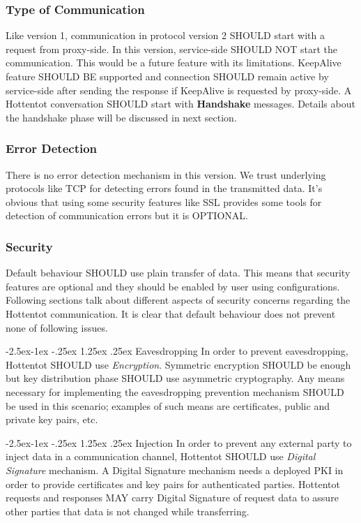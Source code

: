 \documentclass[10pt,a4paper]{article}
\makeatletter
\renewcommand\paragraph{\@startsection{paragraph}{4}{\z@}%
            {-2.5ex\@plus -1ex \@minus -.25ex}%
            {1.25ex \@plus .25ex}%
            {\normalfont\normalsize\bfseries}}
\makeatother
\begin{document}
\subsubsection{Type of Communication}
Like version 1, communication in protocol version 2 SHOULD start with a request from proxy-side. In this version, service-side SHOULD NOT start the communication. This would be a future feature with its limitations. KeepAlive feature SHOULD BE supported and connection SHOULD remain active by service-side after sending the response if KeepAlive is requested by proxy-side. A Hottentot conversation SHOULD start with \textbf{Handshake} messages. Details about the handshake phase will be discussed in next section.

\subsubsection{Error Detection}
There is no error detection mechanism in this version. We trust underlying protocols like TCP for detecting errors found in the transmitted data. It's obvious that using some security features like SSL provides some tools for detection of communication errors but it is OPTIONAL.

\subsubsection{Security}
Default behaviour SHOULD use plain transfer of data. This means that security features are optional and they should be enabled by user using configurations. Following sections talk about different aspects of security concerns regarding the Hottentot communication. It is clear that default behaviour does not prevent none of following issues.

\paragraph{Eavesdropping}
In order to prevent eavesdropping, Hottentot SHOULD use \textit{Encryption}. Symmetric encryption SHOULD be enough but key distribution phase SHOULD use asymmetric cryptography. Any means necessary for implementing the eavesdropping prevention mechanism SHOULD be used in this scenario; examples of such means are certificates, public and private key pairs, etc.

\paragraph{Injection}
In order to prevent any external party to inject data in a communication channel, Hottentot SHOULD use \textit{Digital Signature} mechanism. A Digital Signature mechanism needs a deployed PKI in order to provide certificates and key pairs for authenticated parties. Hottentot requests and responses MAY carry Digital Signature of request data to assure other parties that data is not changed while transferring.
\end{document}
